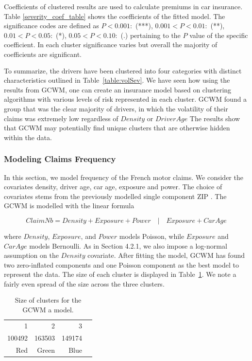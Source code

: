 \documentclass[11pt,letterpaper]{article}
\numberwithin{equation}{section}
\numberwithin{equation}{section}
\numberwithin{equation}{section}
\begin{document}
Coefficients of clustered results are used to calculate premiums in car insurance. Table \ref{severity_coef_table} shows the coefficients of the fitted model. The significance codes are defined as $  P < 0.001 : $  (***), $0.001 < P < 0.01:$ (**), $  0.01 < P < 0.05:$ (*), $0.05 < P < 0.10 : $ (.) %
pertaining to the $P$ value of the specific coefficient. In each cluster significance varies but overall the majority of coefficients are significant.

To summarize, the drivers have been clustered into four categories with distinct characteristics outlined in Table~\ref{table:volSev}. We have seen how using the results from GCWM, one can create an insurance model based on clustering algorithms with various levels of risk represented in each cluster. GCWM found a group that was the clear majority of drivers, in which the volatility of their claims was extremely low regardless of $Density$ or $DriverAge$ The results show that GCWM may potentially find unique clusters that are otherwise hidden within the data.


 \subsubsection{Modeling Claims Frequency}

In this section, we model frequency of the French motor claims. We consider the covariates density, driver age, car age, exposure and power. The choice of covariates stems from the previously modelled single component ZIP \citep{Charpentier:2014}.
The GCWM is modelled with the linear formula

\begin{equation}
Claim Nb = Density + Exposure + Power \quad|\quad Exposure + Car Age
\end{equation}

where $Density$, $Exposure$, and $Power$ models  Poisson, while $Exposure$ and $Car Age$ models Bernoulli. As in Section 4.2.1, we also impose a log-normal assumption on the $Density$ covariate.
After fitting the model, GCWM has found two zero-inflated components and one Poisson component as the best model to represent the data. The size of each cluster is displayed in Table~\ref{table:sizeFreq}. We note a fairly even spread of the size across the three clusters.

 \begin{table}[!htb]
\centering
\caption{Size of clusters for the GCWM a model.}
\label{table:sizeFreq}
\begin{tabular}{rrrr}
\hline\hline
1   & 2  &  3   \\
100492 & 163503 & 149174 \\
Red & Green & Blue  \\
\hline\hline
\end{tabular}
\end{table}
\end{document}
